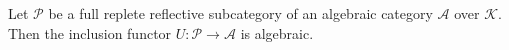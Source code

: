 Let $\mathcal{P}$ be a full replete reflective subcategory of an algebraic category $\mathcal{A}$ over $\mathcal{K}$. Then the inclusion functor $U: \mathcal{P} \longrightarrow \mathcal{A}$ is algebraic.
